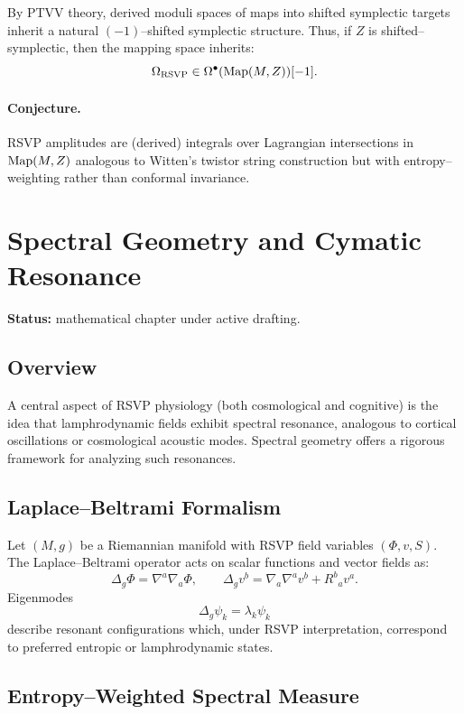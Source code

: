 \documentclass[12pt]{article}
\theoremstyle{plain}
\theoremstyle{definition}
\theoremstyle{remark}
\begin{document}
By PTVV theory, derived moduli spaces of maps into shifted symplectic targets
inherit a natural $(-1)$--shifted symplectic structure. Thus, if $Z$ is
shifted--symplectic, then the mapping space inherits:
\[
    \Omega_{\mathrm{RSVP}} \in \Omega^\bullet({\rm Map}(M,Z))[-1].
\]


\paragraph{Conjecture.}
RSVP amplitudes are (derived) integrals over Lagrangian intersections in
${\rm Map}(M,Z)$ analogous to Witten's twistor string construction but with
entropy--weighting rather than conformal invariance.


\section{Spectral Geometry and Cymatic Resonance}

\textbf{Status:} mathematical chapter under active drafting.


\subsection{Overview}

A central aspect of RSVP physiology (both cosmological and cognitive) is the
idea that lamphrodynamic fields exhibit spectral resonance, analogous to
cortical oscillations or cosmological acoustic modes. Spectral geometry offers
a rigorous framework for analyzing such resonances.


\subsection{Laplace--Beltrami Formalism}

Let $(M,g)$ be a Riemannian manifold with RSVP field variables
$(\Phi,v,S)$. The Laplace--Beltrami operator acts on scalar functions and vector
fields as:
\[
    \Delta_g \Phi = \nabla^a\nabla_a \Phi,
    \qquad
    \Delta_g v^b = \nabla_a\nabla^a v^b + R^b{}_a v^a.
\]
Eigenmodes
\[
    \Delta_g \psi_k = \lambda_k \psi_k
\]
describe resonant configurations which, under RSVP interpretation, correspond to
preferred entropic or lamphrodynamic states.


\subsection{Entropy--Weighted Spectral Measure}
\end{document}
